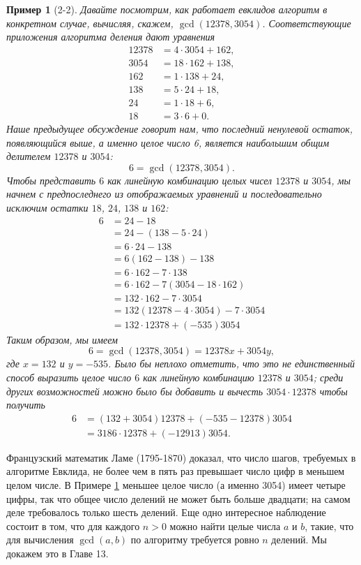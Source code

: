 \documentclass[11pt]{article}
\newtheorem{example}{Пример}
\begin{document}
\begin{example}[2-2]
	\label{ex:2-2}
	Давайте посмотрим, как работает евклидов алгоритм в конкретном случае, вычисляя, скажем, $\gcd (12378, 3054)$. Соответствующие приложения алгоритма деления дают уравнения
	\[
	\begin{split}
		12378 & = 4 \cdot 3054 + 162,\\
		3054 & = 18 \cdot 162 + 138,\\
		162 & = 1 \cdot 138 + 24,\\
		138 & = 5 \cdot 24 + 18,\\
		24 & = 1 \cdot 18 + 6,\\
		18 & = 3 \cdot 6 + 0.
	\end{split}
	\]
	Наше предыдущее обсуждение говорит нам, что последний ненулевой остаток, появляющийся выше, а именно целое число 6, является наибольшим общим делителем $12378$ и $3054$:
	\[6 = \gcd (12378, 3054).\]
	Чтобы представить $6$ как линейную комбинацию целых чисел $12378$ и $3054$, мы начнем с предпоследнего из отображаемых уравнений и последовательно исключим остатки $18$, $24$, $138$ и $162$:
	\[
	\begin{split}
		6 & = 24 - 18\\
		& = 24 - (138 - 5 \cdot 24)\\
		& = 6 \cdot 24 - 138\\
		& = 6(162 - 138) - 138\\
		& = 6 \cdot 162 - 7 \cdot 138\\
		& = 6 \cdot 162 - 7(3054 - 18 \cdot 162)\\
		& = 132 \cdot 162 - 7 \cdot 3054\\
		& = 132(12378 - 4 \cdot 3054) - 7 \cdot 3054\\
		& = 132 \cdot 12378 + (-535)3054
	\end{split}
	\]
	Таким образом, мы имеем
	\[6 = \gcd (12378, 3054) = 12378x + 3054y,\]
	где $x = 132$ и $y = -535$. Было бы неплохо отметить, что это не единственный способ выразить целое число $6$ как линейную комбинацию $12378$ и $3054$; среди других возможностей можно было бы добавить и вычесть $3054 \cdot 12378$ чтобы получить
	\[
	\begin{split}
		6 & = (132 + 3054)12378 + (-535 - 12378)3054\\
		& = 3186 \cdot 12378 + (-12913)3054.
	\end{split}
	\]
\end{example}
Французский математик Ламе (1795-1870) доказал, что число шагов, требуемых в алгоритме Евклида, не более чем в пять раз превышает число цифр в меньшем целом числе. В Примере \ref{ex:2-2} меньшее целое число (а именно 3054) имеет четыре цифры, так что общее число делений не может быть больше двадцати; на самом деле требовалось только шесть делений. Еще одно интересное наблюдение состоит в том, что для каждого $n > 0$ можно найти целые числа $a$ и $b$, такие, что для вычисления $\gcd(a, b)$ по алгоритму требуется ровно $n$ делений. Мы докажем это в Главе 13.
\end{document}
